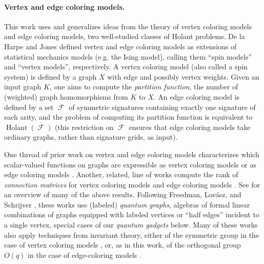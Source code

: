 \documentclass{article}
\DeclareMathOperator{\fc}{\mathcal{F}}
\DeclareMathOperator{\holant}{Holant}
\DeclareMathOperator{\eq}{\mathcal{EQ}}
\DeclareMathOperator{\geneq}{\mathcal{GEQ}}
\begin{document}
\paragraph{Vertex and edge coloring models.}
This work uses and generalizes ideas from the theory of vertex coloring models and edge coloring models,
two well-studied classes of Holant problems.
De la Harpe and Jones \cite{jones} defined vertex and edge coloring models as extensions of 
statistical mechanics models (e.g. the Ising model), calling them ``spin models'' and ``vertex models'',
respectively. A vertex coloring model (also called a spin system) is defined by a graph $X$ with edge and possibly vertex
weights. Given an input graph $K$, one aims to compute the \emph{partition function}, the number of 
(weighted) graph homomorphisms from $K$ to $X$.
An edge coloring model is defined by a set $\fc$ of symmetric signatures containing exactly
one signature of each arity, and the problem of computing its partition function is equivalent to 
$\holant(\fc)$ (this restriction on $\fc$ ensures that
edge coloring models take ordinary graphs, rather than signature grids, as input).

One thread of prior work on vertex and edge coloring models 
characterizes which scalar-valued functions on graphs
are expressible as vertex coloring models \cite{freedman_reflection, schrijver}
or as edge coloring models 
\cite{szegedy_edge_2007, schrijver_graph_2008, draisma_characterizing_2012, regts_characterization_2013}.
Another, related, line of works compute the rank of \emph{connection matrices}
for vertex coloring models \cite{lovasz} and edge coloring models 
\cite{regts_rank_2012,draisma_tensor_2013}.
See \cite{regts} for an overview of many of the above results. 
Following Freedman, Lov\'{a}sz, and Schrijver \cite{freedman_reflection}, these works use
(labeled) \emph{quantum graphs}, algebras of formal linear combinations of graphs 
equipped with labeled vertices or ``half edges'' incident to a single vertex,
special cases of our \emph{quantum gadgets} below.
Many of these works also apply techniques from invariant theory, either of the symmetric group
in the case of vertex coloring models \cite{schrijver}, or, as in this work, of the
orthogonal group $O(q)$ in the case of edge-coloring models \cite{szegedy_edge_2007, schrijver_graph_2008, draisma_characterizing_2012, regts_rank_2012, draisma_tensor_2013, regts_characterization_2013}.
\end{document}
